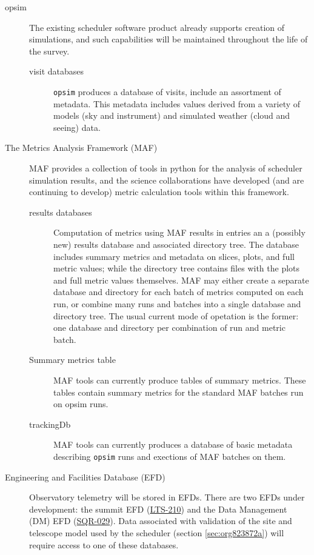 \begin{description}
\item[{opsim}] The existing scheduler software product already supports creation of simulations, and such capabilities will be maintained throughout the life of the survey.
\begin{description}
\item[{visit databases}] \texttt{opsim} produces a database of visits, include an assortment of metadata. This metadata includes values derived from a variety of models (sky and instrument) and simulated weather (cloud and seeing) data.
\end{description}
\item[{The Metrics Analysis Framework (MAF)}] MAF provides a collection of tools in python for the analysis of scheduler simulation results, and the science collaborations have developed (and are continuing to develop) metric calculation tools within this framework. 
\begin{description}
\item[{results databases}] Computation of metrics using MAF results in entries an a (possibly new) results database and associated directory tree. The database includes summary metrics and metadata on slices, plots, and full metric values; while the directory tree contains files with the plots and full metric values themselves. MAF may either create a separate database and directory for each batch of metrics computed on each run, or combine many runs and batches into a single database and directory tree. The usual current mode of opetation is the former: one database and directory per combination of run and metric batch.
\item[{Summary metrics table}] MAF tools can currently produce tables of summary metrics. These tables contain summary metrics for the standard MAF batches run on opsim runs.
\item[{trackingDb}] MAF tools can currently produces a database of basic metadata describing \texttt{opsim} runs and exections of MAF batches on them.
\end{description}
\item[{Engineering and Facilities Database (EFD)}] Observatory telemetry will be stored in EFDs. There are two EFDs under development: the summit EFD (\href{https://ls.st/LTS-210}{LTS-210}) and the Data Management (DM) EFD (\href{https://sqr-029.lsst.io/}{SQR-029}).  Data associated with validation of the site and telescope model used by the scheduler (section \ref{sec:org823872a}) will require access to one of these databases.

\end{description}
